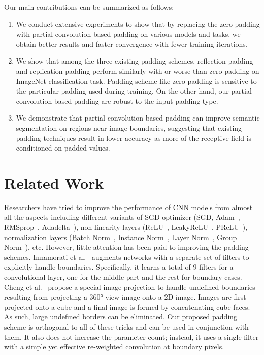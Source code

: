 \documentclass[10pt,twocolumn,letterpaper]{article}
\begin{document}
Our main contributions can be summarized as follows: 
\begin{enumerate}
\item We conduct extensive experiments to show that by replacing the zero padding with partial convolution based padding on various models and tasks, we obtain better results and faster convergence with fewer training iterations.
\item We show that among the three existing padding schemes, reflection padding and replication padding perform similarly with or worse than zero padding on ImageNet classification task. Padding scheme like zero padding is sensitive to the particular padding used during training. On the other hand, our partial convolution based padding are robust to the input padding type.
\item We demonstrate that partial convolution based padding can improve semantic segmentation on regions near image boundaries, suggesting that existing padding techniques result in lower accuracy as more of the receptive field is conditioned on padded values.
\end{enumerate}

\section{Related Work}
Researchers have tried to improve the performance of CNN models from almost all the aspects including different variants of SGD optimizer (SGD, Adam~\cite{kingma2014adam}, RMSprop~\cite{tieleman2012lecture}, Adadelta~\cite{zeiler2012adadelta}), non-linearity layers (ReLU~\cite{nair2010rectified}, LeakyReLU~\cite{maas2013rectifier}, PReLU~\cite{he2015delving}), normalization layers (Batch Norm~\cite{ioffe2015batch}, Instance Norm~\cite{ulyanov1607instance}, Layer Norm~\cite{ba2016layer}, Group Norm~\cite{wu2018group}), etc. However, little attention has been paid to improving the padding schemes. Innamorati et al.~\cite{innamorati2018learning} augments networks with a separate set of filters to explicitly handle boundaries. Specifically, it learns a total of $9$ filters for a convolutional layer, one for the middle part and the rest for boundary cases. Cheng et al.~\cite{cheng2018cube} propose a special image projection to handle undefined boundaries resulting from projecting a \ang{360} view image onto a 2D image. Images are first projected onto a cube and a final image is formed by concatenating cube faces. As such, large undefined borders can be eliminated. Our proposed padding scheme is orthogonal to all of these tricks and can be used in conjunction with them. It also does not increase the parameter count; instead, it uses a single filter with a simple yet effective re-weighted convolution at boundary pixels. 
\end{document}
